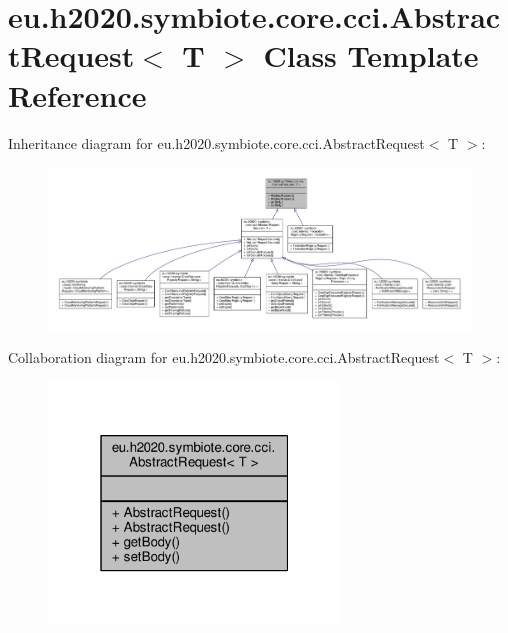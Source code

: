 \hypertarget{classeu_1_1h2020_1_1symbiote_1_1core_1_1cci_1_1AbstractRequest}{}\section{eu.\+h2020.\+symbiote.\+core.\+cci.\+Abstract\+Request$<$ T $>$ Class Template Reference}
\label{classeu_1_1h2020_1_1symbiote_1_1core_1_1cci_1_1AbstractRequest}


Inheritance diagram for eu.\+h2020.\+symbiote.\+core.\+cci.\+Abstract\+Request$<$ T $>$\+:
\nopagebreak
\begin{figure}[H]
\begin{center}
\leavevmode
\includegraphics[width=350pt]{classeu_1_1h2020_1_1symbiote_1_1core_1_1cci_1_1AbstractRequest__inherit__graph}
\end{center}
\end{figure}


Collaboration diagram for eu.\+h2020.\+symbiote.\+core.\+cci.\+Abstract\+Request$<$ T $>$\+:\nopagebreak
\begin{figure}[H]
\begin{center}
\leavevmode
\includegraphics[width=220pt]{classeu_1_1h2020_1_1symbiote_1_1core_1_1cci_1_1AbstractRequest__coll__graph}
\end{center}
\end{figure}
